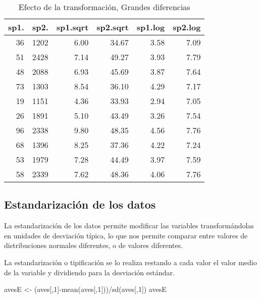 \documentclass[
]{article}
\newenvironment{Shaded}{\begin{snugshade}}{\end{snugshade}}
\newcommand{\DecValTok}[1]{\textcolor[rgb]{0.00,0.00,0.81}{#1}}
\newcommand{\FunctionTok}[1]{\textcolor[rgb]{0.00,0.00,0.00}{#1}}
\newcommand{\NormalTok}[1]{#1}
\newcommand{\OtherTok}[1]{\textcolor[rgb]{0.56,0.35,0.01}{#1}}
\newcommand{\SpecialCharTok}[1]{\textcolor[rgb]{0.00,0.00,0.00}{#1}}
\begin{document}
\begin{table}

\caption{\label{tab:unnamed-chunk-17}Efecto de la transformación, Grandes diferencias}
\centering
\begin{tabular}[t]{r|r|r|r|r|r}
\hline
sp1. & sp2. & sp1.sqrt & sp2.sqrt & sp1.log & sp2.log\\
\hline
36 & 1202 & 6.00 & 34.67 & 3.58 & 7.09\\
\hline
51 & 2428 & 7.14 & 49.27 & 3.93 & 7.79\\
\hline
48 & 2088 & 6.93 & 45.69 & 3.87 & 7.64\\
\hline
73 & 1303 & 8.54 & 36.10 & 4.29 & 7.17\\
\hline
19 & 1151 & 4.36 & 33.93 & 2.94 & 7.05\\
\hline
26 & 1891 & 5.10 & 43.49 & 3.26 & 7.54\\
\hline
96 & 2338 & 9.80 & 48.35 & 4.56 & 7.76\\
\hline
68 & 1396 & 8.25 & 37.36 & 4.22 & 7.24\\
\hline
53 & 1979 & 7.28 & 44.49 & 3.97 & 7.59\\
\hline
58 & 2339 & 7.62 & 48.36 & 4.06 & 7.76\\
\hline
\end{tabular}
\end{table}

\hypertarget{estandarizaciuxf3n-de-los-datos}{%
\subsection{Estandarización de los datos}\label{estandarizaciuxf3n-de-los-datos}}

La estandarización de los datos permite modificar las variables transformándolas en unidades de desviación típica, lo que nos permite comparar entre valores de distribuciones normales diferentes, o de valores diferentes.

La estandarización o tipificación se lo realiza restando a cada valor el valor medio de la variable y dividiendo para la desviación estándar.

\begin{Shaded}
\begin{Highlighting}[]
\NormalTok{avesE }\OtherTok{\textless{}{-}}\NormalTok{ (aves[,}\DecValTok{1}\NormalTok{]}\SpecialCharTok{{-}}\FunctionTok{mean}\NormalTok{(aves[,}\DecValTok{1}\NormalTok{]))}\SpecialCharTok{/}\FunctionTok{sd}\NormalTok{(aves[,}\DecValTok{1}\NormalTok{])}
\NormalTok{avesE}
\end{Highlighting}
\end{Shaded}
\end{document}
